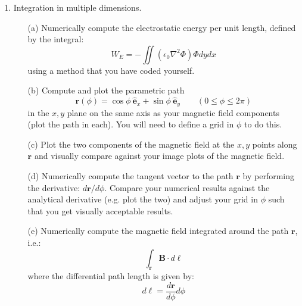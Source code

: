 \documentclass{article}
\begin{document}
\begin{enumerate}
\begin{itemize}
    
  \end{itemize}
  \item  Integration in multiple dimensions.  
  \begin{itemize}
    \item[(a)] Numerically compute the electrostatic energy per unit length, defined by the integral:  
    \begin{equation}
      W_E = - \iint \left( \epsilon_0 \nabla^2 \Phi \right) \Phi dy dx
    \end{equation}
    using a method that you have coded yourself.  
    \item[(b)]  Compute and plot the parametric path
    \begin{equation}
       \mathbf{r}(\phi) = \cos \phi ~ \hat{\mathbf{e}}_x + \sin \phi ~ \hat{\mathbf{e}}_y \qquad (0 \le \phi \le 2 \pi)
    \end{equation}    
    in the $x,y$ plane on the same axis as your magnetic field components (plot the path in each).  You will need to define a grid in $\phi$ to do this.
    \item[(c)]  Plot the two components of the magnetic field at the $x,y$ points along $\mathbf{r}$ and visually compare against your image plots of the magnetic field.  
    \item[(d)]  Numerically compute the tangent vector to the path $\mathbf{r}$ by performing the derivative:  $d \mathbf{r} / d \phi$.  Compare your numerical results against the analytical derivative (e.g. plot the two) and adjust your grid in $\phi$ such that you get visually acceptable results.  
    \item[(e)]  Numerically compute the magnetic field integrated around the path $\mathbf{r}$, i.e.:
    \begin{equation}
       \int_{\mathbf{r}} \mathbf{B} \cdot d \boldsymbol{\ell} 
    \end{equation}
    where the differential path length is given by:
    \begin{equation}
      d \boldsymbol{\ell} = \frac{d \mathbf{r}}{d \phi} d \phi 
    \end{equation}   
  \end{itemize}
\end{enumerate}
\end{document}
